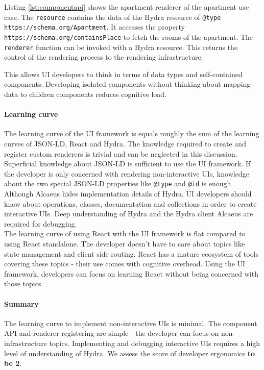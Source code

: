 Listing \ref{lst:componentapi} shows the apartment renderer of the apartment use case. The \lstinline{resource} contains the data of the Hydra resource of \lstinline{@type} \lstinline{https://schema.org/Apartment}. It accesses the property \lstinline{https://schema.org/containsPlace} to fetch the rooms of the apartment. The \lstinline{renderer} function can be invoked with a Hydra resource. This returns the control of the rendering process to the rendering infrastructure.

This allows UI developers to think in terms of data types and self-contained components. Developing isolated components without thinking about mapping data to children components reduces \gls{cognitive load}.

\paragraph{Learning curve}
The learning curve of the UI framework is equals roughly the sum of the learning curves of JSON-LD, React and Hydra. The knowledge required to create and register custom renderers is trivial and can be neglected in this discussion. \\
Superficial knowledge about JSON-LD is sufficient to use the UI framework. If the developer is only concerned with rendering non-interactive UIs, knowledge about the two special JSON-LD properties like \lstinline{@type} and \lstinline{@id} is enough. \\
Although Alcaeus hides implementation details of Hydra, UI developers should know about operations, classes, documentation and collections in order to create interactive UIs. Deep understanding of Hydra and the Hydra client Alcaeus are required for debugging. \\
The learning curve of using React with the UI framework is flat compared to using React standalone. The developer doesn't have to care about topics like state management and client side routing. React has a mature ecosystem of tools covering these topics - their use comes with cognitive overhead. Using the UI framework, developers can focus on learning React without being concerned with those topics.

\paragraph{Summary}
The learning curve to implement non-interactive UIs is minimal. The component API and renderer registering are simple - the developer can focus on non-infrastructure topics. Implementing and debugging interactive UIs requires a high level of understanding of Hydra. We assess the score of developer ergonomics \textbf{to be 2}.

